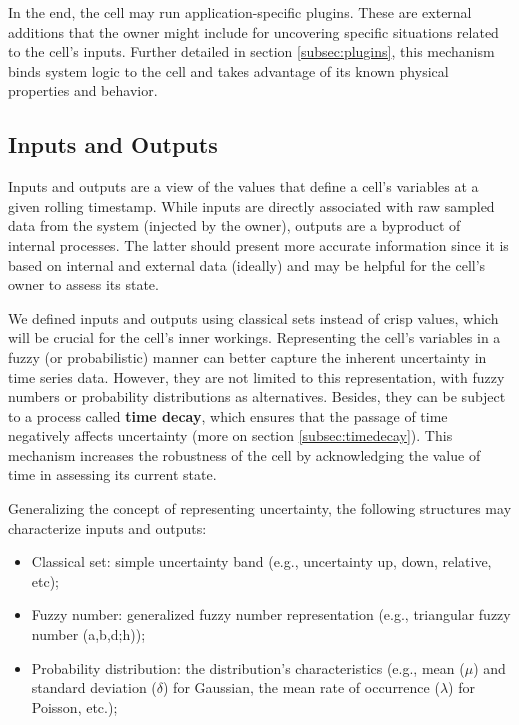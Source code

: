 In the end, the cell may run application-specific plugins. These are external additions that the owner might include for uncovering specific situations related to the cell's inputs. Further detailed in section \ref{subsec:plugins}, this mechanism binds system logic to the cell and takes advantage of its known physical properties and behavior.

\subsection{Inputs and Outputs} \label{subsec:inout}

Inputs and outputs are a view of the values that define a cell's variables at a given rolling timestamp. While inputs are directly associated with raw sampled data from the system (injected by the owner), outputs are a byproduct of internal processes. The latter should present more accurate information since it is based on internal and external data (ideally) and may be helpful for the cell's owner to assess its state.

We defined inputs and outputs using classical sets instead of crisp values, which will be crucial for the cell's inner workings. Representing the cell's variables in a fuzzy (or probabilistic) manner can better capture the inherent uncertainty in time series data. However, they are not limited to this representation, with fuzzy numbers or probability distributions as alternatives. Besides, they can be subject to a process called \textbf{time decay}, which ensures that the passage of time negatively affects uncertainty (more on section \ref{subsec:timedecay}). This mechanism increases the robustness of the cell by acknowledging the value of time in assessing its current state.

Generalizing the concept of representing uncertainty, the following structures may characterize inputs and outputs:

\begin{itemize}
    \item Classical set: simple uncertainty band (e.g., uncertainty up, down, relative, etc);
    \item Fuzzy number: generalized fuzzy number representation \cite{Zhang2019} (e.g., triangular fuzzy number (a,b,d;h));
    \item Probability distribution: the distribution's characteristics (e.g., mean ($\mu$) and standard deviation ($\delta$) for Gaussian, the mean rate of occurrence ($\lambda$) for Poisson, etc.);
\end{itemize}

